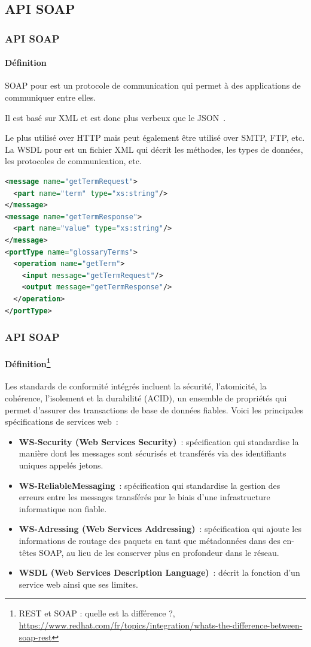 \documentclass{beamer}
\begin{document}
    \subsection{API SOAP}\label{subsec:api-soap}

    \begin{frame}[fragile]
        \transdissolve
        \frametitle{API SOAP}
        \framesubtitle{Définition}
        SOAP pour  est un protocole de communication qui permet à des applications de communiquer entre elles.

        Il est basé sur XML et est donc plus verbeux que le JSON~.

        Le plus utilisé over HTTP mais peut également être utilisé over SMTP, FTP, etc.
        \bigbreak
        La WSDL pour  est un fichier XML qui décrit les méthodes, les types de données, les protocoles de communication, etc.
        \begin{lstlisting}[language=xml,basicstyle=\ttfamily\tiny]
<message name="getTermRequest">
  <part name="term" type="xs:string"/>
</message>
<message name="getTermResponse">
  <part name="value" type="xs:string"/>
</message>
<portType name="glossaryTerms">
  <operation name="getTerm">
    <input message="getTermRequest"/>
    <output message="getTermResponse"/>
  </operation>
</portType>
        \end{lstlisting}
    \end{frame}
    \begin{frame}[fragile]
        \transdissolve
        \frametitle{API SOAP}
        \framesubtitle{Définition\footnote{REST et SOAP : quelle est la différence ?, \url{https://www.redhat.com/fr/topics/integration/whats-the-difference-between-soap-rest}}}
        Les standards de conformité intégrés incluent la sécurité, l'atomicité, la cohérence, l'isolement et la durabilité (ACID), un ensemble de propriétés qui permet d'assurer des transactions de base de données fiables.
        Voici les principales spécifications de services web~:
        \begin{itemize}
            \item \textbf{WS-Security (Web Services Security)}~: spécification qui standardise la manière dont les messages sont sécurisés et transférés via des identifiants uniques appelés jetons.
            \item \textbf{WS-ReliableMessaging}~: spécification qui standardise la gestion des erreurs entre les messages transférés par le biais d'une infrastructure informatique non fiable.
            \item \textbf{WS-Adressing (Web Services Addressing)}~: spécification qui ajoute les informations de routage des paquets en tant que métadonnées dans des en-têtes SOAP, au lieu de les conserver plus en profondeur dans le réseau.
            \item \textbf{WSDL (Web Services Description Language)}~: décrit la fonction d'un service web ainsi que ses limites.
        \end{itemize}
    \end{frame}
\end{document}
